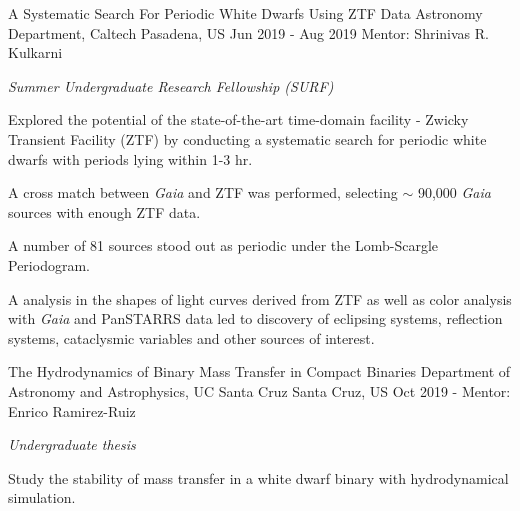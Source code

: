 \begin{cvexperiences}
\cvexperience
{A Systematic Search For Periodic White Dwarfs Using ZTF Data} %
{Astronomy Department, Caltech} %
{Pasadena, US} %
{Jun 2019 - Aug 2019} %
{Mentor: Shrinivas R. Kulkarni}
{ %
	\begin{cvitems}
		\item {\textit{Summer Undergraduate Research Fellowship (SURF)}}
		\item {Explored the potential of the state-of-the-art time-domain facility - Zwicky Transient Facility (ZTF) by conducting a systematic search for periodic white dwarfs with periods lying within 1-3 hr.}
		\item {A cross match between \textit{Gaia} and ZTF was performed, selecting $\sim$ 90,000 \textit{Gaia} sources with enough ZTF data.}
		\item {A number of 81 sources stood out as periodic under the Lomb-Scargle Periodogram. }
		\item {A analysis in the shapes of light curves derived from ZTF as well as color analysis with \textit{Gaia} and PanSTARRS data led to discovery of eclipsing systems, reflection systems, cataclysmic variables and other sources of interest.}
	\end{cvitems}
}

\cvexperience
{The Hydrodynamics of Binary Mass Transfer in Compact Binaries} %
{Department of Astronomy and Astrophysics, UC Santa Cruz} %
{Santa Cruz, US} %
{Oct 2019 -} %
{Mentor: Enrico Ramirez-Ruiz}
{ %
	\begin{cvitems}
		\item {\textit{Undergraduate thesis}}
		\item {Study the stability of mass transfer in a white dwarf binary with hydrodynamical simulation.}
	\end{cvitems}
}

\end{cvexperiences}